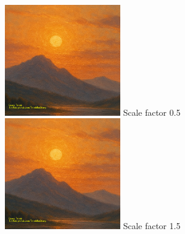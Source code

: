 \documentclass[12pt, a4paper, twoside]{report}
\begin{document}
\includegraphics[width=5cm, keepaspectratio=true, angle=20, scale=0.5]{./sunset.png} Scale factor 0.5\\

\includegraphics[width=5cm, keepaspectratio=true, angle=20, scale=1.5]{./sunset.png} Scale factor 1.5\\









\end{document}
